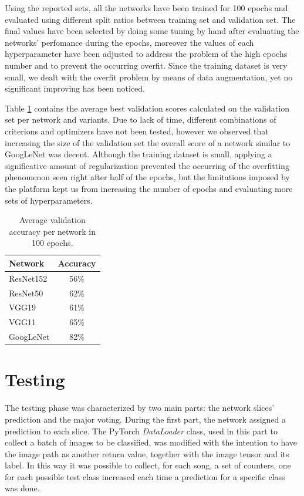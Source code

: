\documentclass[10pt,twocolumn,letterpaper]{article}
\begin{document}
Using the reported sets, all the networks have been trained for 100 epochs and evaluated using different split ratios between training set and validation set. The final values have been selected by doing some tuning by hand after evaluating the networks' perfomance during the epochs, moreover the values of each hyperparameter have been adjusted to address the problem of the high epochs number and to prevent the occurring overfit. Since the training dataset is very small, we dealt with the overfit problem by means of data augmentation, yet no significant improving has been noticed.

Table \ref{tab:val} contains the average best validation scores calculated on the validation set per network and variants. Due to lack of time, different combinations of criterions and optimizers have not been tested, however we observed that increasing the size of the validation set the overall score of a network similar to GoogLeNet was decent. Although the training dataset is small, applying a significative amount of regularization prevented the occurring of the overfitting phenomenon seen right after half of the epochs, but the limitations imposed by the platform kept us from increasing the number of epochs and evaluating more sets of hyperparameters.

\begin{table}[ht]
   \begin{center}
   \def\arraystretch{1.5}
   \begin{tabular}{l|c}
      \textbf{Network} & \textbf{Accuracy} \\
   \hline
   ResNet152 & 56\%  \\
   \hline
   ResNet50 & 62\%  \\
   \hline
   VGG19 & 61\% \\
   \hline
   VGG11 & 65\% \\
   \hline
   GoogLeNet & 82\% \\
   \end{tabular}
   \end{center}
   \caption{Average validation accuracy per network in 100 epochs.}
   \label{tab:val}
   \end{table}

\section{Testing}\label{testing}

The testing phase was characterized by two main parts: the network slices' prediction and the major voting.
During the first part, the network assigned a prediction to each slice. The PyTorch \textit{DataLoader} class, used in this part to collect a batch of images to be classified, was modified with the intention to have the image path as another return value, together with the image tensor and its label. In this way it was possible to collect, for each song, a set of counters, one for each possible test class increased each time a prediction for a specific class was done.
\end{document}
